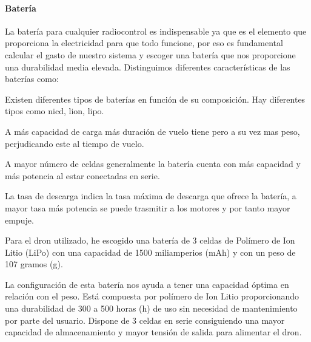 \paragraph{Batería}
\label{SSS:Bateria}

 La batería para cualquier radiocontrol es indispensable ya que es el elemento que proporciona la electricidad para que todo funcione, por eso es fundamental calcular el gasto de nuestro sistema y escoger una batería que nos proporcione una durabilidad media elevada.
 Distinguimos diferentes características de las baterías como:
 
 \begin{description}
 \item[Composición: ]  Existen diferentes tipos de baterías en función de su composición. Hay diferentes tipos como \acl{nicd}, \acl{lion}, \acl{lipo}.
 \item[Capacidad: ] A más capacidad de carga más duración de vuelo tiene pero a su vez mas peso, perjudicando este al tiempo de vuelo.
 \item[Número de celdas: ] A mayor número de celdas generalmente la batería cuenta con más capacidad y más potencia al estar conectadas en serie.
 \item[Tasa de descarga: ] La tasa de descarga indica la tasa máxima de descarga que ofrece la batería, a mayor tasa más potencia se puede trasmitir a los motores y por tanto mayor empuje. 
 \end{description}

Para el dron utilizado, he escogido una batería de 3 celdas de Polímero de Ion Litio (LiPo) con una capacidad de 1500 miliamperios (mAh) y con un peso de 107 gramos (g). 


La configuración de esta batería nos ayuda a tener una capacidad óptima en relación con el peso. 
Está compuesta por polímero de Ion Litio proporcionando una durabilidad de 300 a 500 horas (h) de uso sin necesidad de mantenimiento por parte del usuario. 
Dispone de 3 celdas en serie consiguiendo una mayor capacidad de almacenamiento y mayor tensión de salida para alimentar el dron.


	
